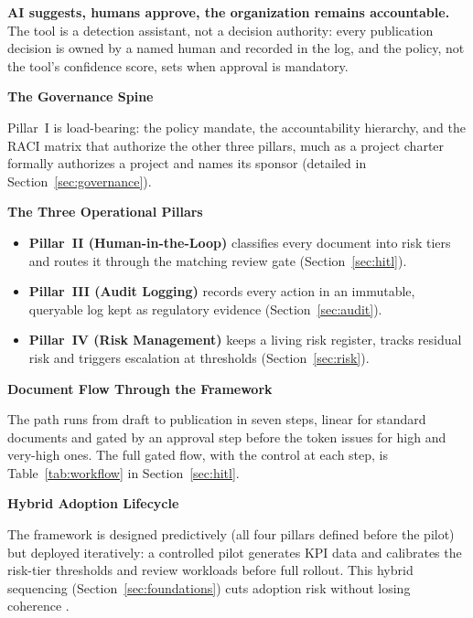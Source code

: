 \documentclass[12pt,a4paper]{article}
\begin{document}
\begin{principlebox}
\textbf{AI suggests, humans approve, the organization remains accountable.} The tool is a detection assistant, not a decision authority: every publication decision is owned by a named human and recorded in the log, and the policy, not the tool's confidence score, sets when approval is mandatory.
\end{principlebox}

\noindent\textbf{The Governance Spine}\par

Pillar~I is load-bearing: the policy mandate, the accountability hierarchy, and the RACI matrix that authorize the other three pillars, much as a project charter formally authorizes a project and names its sponsor \cite{falchi_slides} (detailed in Section~\ref{sec:governance}).

\noindent\textbf{The Three Operational Pillars}\par

\begin{itemize}
  \item \textbf{Pillar~II (Human-in-the-Loop)} classifies every document into risk tiers and routes it through the matching review gate (Section~\ref{sec:hitl}).
  \item \textbf{Pillar~III (Audit Logging)} records every action in an immutable, queryable log kept as regulatory evidence (Section~\ref{sec:audit}).
  \item \textbf{Pillar~IV (Risk Management)} keeps a living risk register, tracks residual risk and triggers escalation at thresholds (Section~\ref{sec:risk}).
\end{itemize}

\noindent\textbf{Document Flow Through the Framework}\par

The path runs from draft to publication in seven steps, linear for standard documents and gated by an approval step before the token issues for high and very-high ones. The full gated flow, with the control at each step, is Table~\ref{tab:workflow} in Section~\ref{sec:hitl}.

\noindent\textbf{Hybrid Adoption Lifecycle}\par

The framework is designed predictively (all four pillars defined before the pilot) but deployed iteratively: a controlled pilot generates KPI data and calibrates the risk-tier thresholds and review workloads before full rollout. This hybrid sequencing (Section~\ref{sec:foundations}) cuts adoption risk without losing coherence \cite{falchi_slides}.
\end{document}
